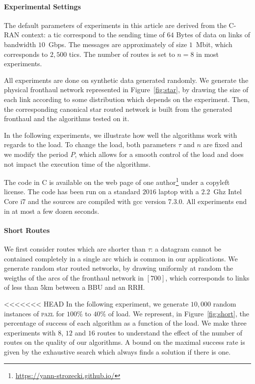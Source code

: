 \documentclass[a4paper,10pt]{article}
\newcommand\pazl{\textsc{pazl}\xspace}
\begin{document}
   \paragraph{Experimental Settings}

     The default parameters of experiments in this article are derived from the C-RAN context: a tic correspond to the sending time of $64$ Bytes of data on links of bandwidth $10$~Gbps. The messages are approximately of size $1$~Mbit, which corresponds to $2,500$ tics. The number of routes is set to $n = 8$ in most experiments. 

     All experiments are done on synthetic data generated randomly. We generate the physical fronthaul
     network represented in Figure~\ref{fig:star}, by drawing the size of each link according 
     to some distribution which depends on the experiment. Then, the corresponding canonical star routed network is built from the generated fronthaul and the algorithms tested on it. 

     In the following experiments, we illustrate how well the algorithms work with regards to the load. To change the load, both parameters $\tau$ and $n$ are fixed and we modify the period $P$, which allows for a smooth control of the load and does not impact the execution time of the algorithms.

     The code in C is available on the web page of one author\footnote{\url{https://yann-strozecki.github.io/}} under a copyleft license. The code has been run on a standard $2016$ laptop with a $2.2$~Ghz Intel Core i7 and the sources are compiled with gcc version 7.3.0. All experiments end in at most a few dozen seconds.

    \paragraph{Short Routes}
      
    

 	 We first consider routes which are shorter than $\tau$: a datagram cannot be contained completely in a single arc which is common in our applications. We generate random star routed networks, by drawing uniformly at random the weigths of the arcs of the fronthaul network in $[700]$, which corresponds to links of less than $5$km between a BBU and an RRH.

<<<<<<< HEAD
     In the following experiment, we generate $10,000$ random instances of \pazl for $100\%$ to $40\%$ of load. We represent, in Figure~\ref{fig:short}, the percentage of success of each algorithm as a function of the load. We make three experiments with $8$, $12$ and $16$ routes to understand the effect of the number of routes on the quality of our algorithms. A bound on the maximal success rate is given by the exhaustive search which always finds a solution if there is one. 
       
\end{document}

